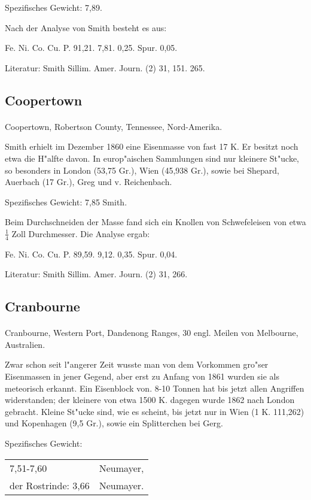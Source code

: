 \documentclass[a4paper, 11pt, oneside]{article}
\begin{document}
Spezifisches Gewicht: 7,89.

Nach der Analyse von Smith besteht es aus:

Fe. Ni. Co. Cu. P.  
91,21. 7,81. 0,25. Spur. 0,05.

\footnotesize
Literatur: Smith Sillim. Amer. Journ. (2) 31, 151. 265.

\subsection{Coopertown}
\normalsize
\paragraph{}
Coopertown, Robertson County, Tennessee, Nord-Amerika.

Smith erhielt im Dezember 1860 eine Eisenmasse von fast 17 K. Er besitzt noch etwa die H"alfte davon. In europ"aischen Sammlungen sind nur kleinere St"ucke, so besonders in London (53,75 Gr.), Wien (45,938 Gr.), sowie bei Shepard, Auerbach (17 Gr.), Greg und v. Reichenbach.

Spezifisches Gewicht: 7,85 Smith.

Beim Durchschneiden der Masse fand sich ein Knollen von Schwefeleisen von etwa $\frac{1}{4}$ Zoll Durchmesser. Die Analyse ergab:

Fe. Ni. Co. Cu. P.  
89,59. 9,12. 0,35. Spur. 0,04.

\footnotesize
Literatur: Smith Sillim. Amer. Journ. (2) 31, 266.

\subsection{Cranbourne}
\normalsize
\paragraph{}
Cranbourne, Western Port, Dandenong Ranges, 30 engl. Meilen von Melbourne, Australien.

Zwar schon seit l"angerer Zeit wusste man von dem Vorkommen gro"ser Eisenmassen in jener Gegend, aber erst zu Anfang von 1861 wurden sie als meteorisch erkannt. Ein Eisenblock von. 8-10 Tonnen hat bis jetzt allen Angriffen widerstanden; der kleinere von etwa 1500 K. dagegen wurde 1862 nach London gebracht. Kleine St"ucke sind, wie es scheint, bis jetzt nur in Wien (1 K. 111,262) und Kopenhagen (9,5 Gr.), sowie ein Splitterchen bei Gerg.

Spezifisches Gewicht: 
\begin{table}[!ht]
    \centering
    \begin{tabular}{l l}
        7,51-7,60 & Neumayer,\\
        der Rostrinde: 3,66 & Neumayer.
    \end{tabular}
\end{table}
\end{document}
